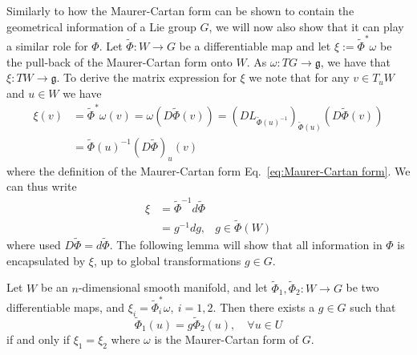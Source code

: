 Similarly to how the Maurer-Cartan form can be shown to contain the geometrical information of a Lie group $G$, we will now also show that it can play a similar role for $\Phi$. Let $\tilde{\Phi} : W \to G$ be a differentiable map and let $\xi := \tilde{\Phi}^* \omega$ be the pull-back of the Maurer-Cartan form onto $W$. As $\omega : TG \to \mathfrak{g}$, we have that $\xi : TW \to \mathfrak{g}$. To derive the matrix expression for $\xi$ we note that for any $v \in T_u W$ and $u \in W$ we have
\begin{equation}
\begin{aligned}
\xi(v) & = \tilde{\Phi}^* \omega(v)  = \omega(D\tilde{\Phi}(v)) = ( D L_{ \tilde{\Phi}(u)^{-1} } )_{ \tilde{\Phi}(u) }( D\tilde{\Phi}(v)  ) \\
& = \tilde{\Phi}(u)^{-1} (D\tilde{\Phi})_u (v)
\end{aligned}
\end{equation}
where the definition of the Maurer-Cartan form Eq.~\ref{eq:Maurer-Cartan form}. We can thus write
\begin{equation} \label{eq:pullback Maurer-Cartan}
\begin{aligned}
\xi & = \tilde{\Phi}^{-1} d \tilde{\Phi} \\
& = g^{-1} dg, & g \in \tilde{\Phi}(W)
\end{aligned}
\end{equation}
where used $D\tilde{\Phi} = d\tilde{\Phi}$. The following lemma will show that all information in $\Phi$ is encapsulated by $\xi$, up to global transformations $g \in G$.

\begin{lemma}
Let $W$ be an $n$-dimensional smooth manifold, and let $\tilde{\Phi}_1, \tilde{\Phi}_2 : W \to G$ be two differentiable maps, and $\xi_i = \tilde{\Phi}^*_i \omega,\ i=1,2$. Then there exists a $g \in G$ such that
\begin{equation} \label{eq:global transformations of Phi}
\tilde{\Phi}_1(u) =  g \tilde{\Phi}_2(u), \quad \forall u\in U
\end{equation}
if and only if $\xi_1 = \xi_2$ where $\omega$ is the Maurer-Cartan form of $G$.
\end{lemma}

